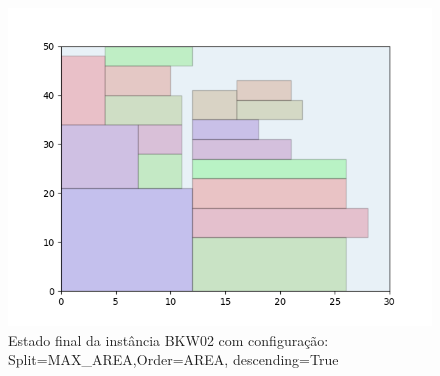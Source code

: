 \begin{figure}[H]
    \centering
    \caption[]{Estado final da instância BKW02 com configuração: Split=MAX_AREA,Order=AREA, descending=True}
    \label{fig:bkw02-max_area-area-true}
    \includegraphics[scale=0.5]{output/figures/bkw/bkw02/max_area/area/true/00}
\end{figure}